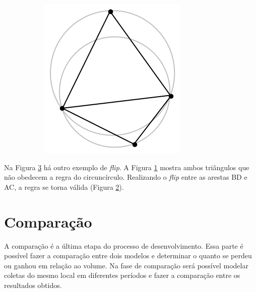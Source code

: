\begin{figure}[H]
\begin{subfigure}[t]{0.27\textwidth}
        \caption{}
        \label{fig:delaunay_theorem2}
    \end{subfigure}
    \hspace{2em}
    \begin{subfigure}[t]{0.2\textwidth}
        \includegraphics[width=\textwidth]{dados/figuras/delaunay_theorem3.png}
        \caption{}
        \label{fig:delaunay_theorem3}
    \end{subfigure}
    \label{fig:delaunay_theorem}
\end{figure}

Na Figura \ref{fig:delaunay_theorem} há outro exemplo de \textit{flip}. A Figura \ref{fig:delaunay_theorem2} mostra ambos triângulos que não obedecem a regra do circuncírculo. Realizando o \textit{flip} entre as arestas BD e AC, a regra se torna válida (Figura \ref{fig:delaunay_theorem3}). 

\section{Comparação}
\label{sec:comparacao}

A comparação é a última etapa do processo de desenvolvimento. Essa parte é possível fazer a comparação entre dois modelos e determinar o quanto se perdeu ou ganhou em relação ao volume. Na fase de comparação será possível modelar coletas do mesmo local em diferentes períodos e fazer a comparação entre os resultados obtidos.



